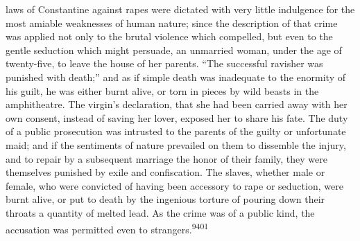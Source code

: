 laws of Constantine against rapes were dictated with very little
indulgence for the most amiable weaknesses of human nature; since
the description of that crime was applied not only to the brutal
violence which compelled, but even to the gentle seduction which
might persuade, an unmarried woman, under the age of twenty-five,
to leave the house of her parents. “The successful ravisher was
punished with death;” and as if simple death was inadequate to
the enormity of his guilt, he was either burnt alive, or torn in
pieces by wild beasts in the amphitheatre. The virgin’s
declaration, that she had been carried away with her own consent,
instead of saving her lover, exposed her to share his fate. The
duty of a public prosecution was intrusted to the parents of the
guilty or unfortunate maid; and if the sentiments of nature
prevailed on them to dissemble the injury, and to repair by a
subsequent marriage the honor of their family, they were
themselves punished by exile and confiscation. The slaves,
whether male or female, who were convicted of having been
accessory to rape or seduction, were burnt alive, or put to death
by the ingenious torture of pouring down their throats a quantity
of melted lead. As the crime was of a public kind, the accusation
was permitted even to strangers.\textsuperscript{9401}

